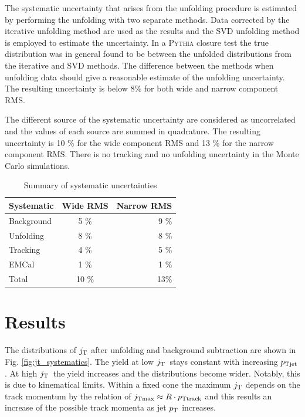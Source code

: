 The systematic uncertainty that arises from the unfolding procedure is estimated by performing the unfolding with two separate methods. Data corrected by the iterative unfolding method are used as the results and the SVD unfolding method is employed to estimate the uncertainty. In a \textsc{Pythia} closure test the true distribution was in general found to be between the unfolded distributions from the iterative and SVD methods. The difference between the methods when unfolding data should give a reasonable estimate of the unfolding uncertainty. The resulting uncertainty is below 8\% for both wide and narrow component RMS.

The different source of the systematic uncertainty are considered as uncorrelated and the values of each source are summed in quadrature. The resulting uncertainty is 10 \% for the wide component RMS and 13 \% for the narrow component RMS. There is no tracking and no unfolding uncertainty in the Monte Carlo simulations.

\begin{table}[htb]
\centering
\caption{Summary of systematic uncertainties}
\label{tab:systematics}
\begin{tabular}{ l | c | r }
  Systematic & Wide RMS & Narrow RMS \\
    \hline			
  Background & 5 \% & 9 \% \\
  Unfolding & 8 \% & 8 \% \\
  Tracking & 4 \% & 5 \% \\ 
  EMCal & 1 \% & 1 \% \\
  Total & 10 \% & 13\% \\
  \hline
  \end{tabular}
  \end{table}


\section{Results}
\label{sec:results}

The distributions of $j_{\rm T}$ after unfolding and background subtraction are shown in Fig. \ref{fig:jt_systematics}.
The yield at low $j_{\rm T}$ stays constant with increasing $p_{\rm Tjet}$. At high $j_{\rm T}$ the yield increases and the distributions become wider. Notably, this is due to kinematical limits. Within a fixed cone the maximum $j_{\rm T}$ depends on the track momentum by the relation of $j_{\rm Tmax} \approx R \cdot p_{\rm Ttrack}$ and this results an increase of the possible track momenta as jet $p_{\rm T}$ increases. 


